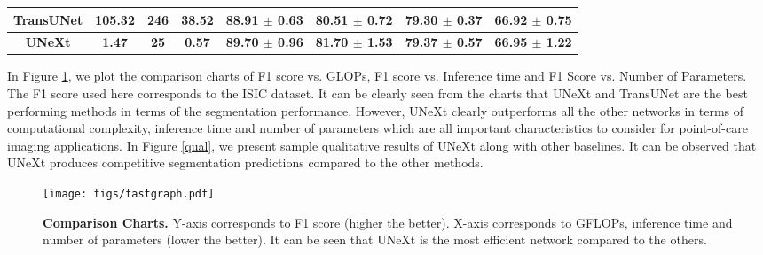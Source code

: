 \documentclass[runningheads]{llncs}
\begin{document}
\begin{table}[htbp]
{\begin{tabular}{c|c|c|c|cc|cc}
TransUNet \cite{chen2021transunet}               & 105.32                      & 246                                                                       & 38.52                   & 88.91 $\pm$ 0.63              & 80.51 $\pm$ 0.72  & 79.30 $\pm$ 0.37              & 66.92 $\pm$ 0.75                      \\ \hline
\textbf{UNeXt}                & \textbf{1.47}                        & \textbf{25}                                                                        & \textbf{0.57}                    & \textbf{89.70 $\pm$ 0.96}           & \textbf{81.70 $\pm$ 1.53} & \textbf{79.37 $\pm$ 0.57}             & \textbf{66.95 $\pm$ 1.22} \\ \hline
\end{tabular}}
\end{table}

In Figure \ref{graph}, we plot the comparison  charts of F1 score vs. GLOPs, F1 score vs. Inference time and F1 Score vs. Number of Parameters. The F1 score used here corresponds to the ISIC dataset. It can be clearly seen from the charts that UNeXt and TransUNet are the best performing methods in terms of the segmentation performance. However, UNeXt clearly outperforms all the other networks in terms of computational complexity, inference time and number of parameters which are all important characteristics to consider for point-of-care imaging applications. In Figure \ref{qual}, we present sample qualitative results of UNeXt along with other baselines. It can be observed that UNeXt produces competitive segmentation predictions compared to the other methods.


\begin{figure}[htbp]
	\centering
	\texttt{[image: figs/fastgraph.pdf]}
	
	\vskip-11pt\caption{\textbf{Comparison Charts.} Y-axis corresponds to F1 score (higher the better). X-axis corresponds to GFLOPs, inference time and number of parameters (lower the better). It can be seen that UNeXt is the most efficient network  compared to the others.  }  
	\label{graph}

\end{figure}
\end{document}
